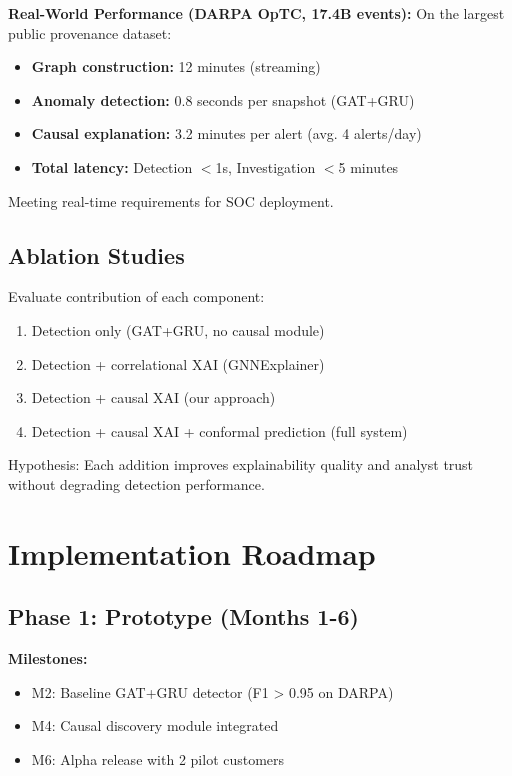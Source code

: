 \documentclass[conference]{IEEEtran}
\begin{document}
\textbf{Real-World Performance (DARPA OpTC, 17.4B events):}
On the largest public provenance dataset:
\begin{itemize}
    \item \textbf{Graph construction:} 12 minutes (streaming)
    \item \textbf{Anomaly detection:} 0.8 seconds per snapshot (GAT+GRU)
    \item \textbf{Causal explanation:} 3.2 minutes per alert (avg. 4 alerts/day)
    \item \textbf{Total latency:} Detection $<$1s, Investigation $<$5 minutes
\end{itemize}

Meeting real-time requirements for SOC deployment.

\subsection{Ablation Studies}

Evaluate contribution of each component:
\begin{enumerate}
    \item Detection only (GAT+GRU, no causal module)
    \item Detection + correlational XAI (GNNExplainer)
    \item Detection + causal XAI (our approach)
    \item Detection + causal XAI + conformal prediction (full system)
\end{enumerate}

Hypothesis: Each addition improves explainability quality and analyst trust without degrading detection performance.

\section{Implementation Roadmap}

\subsection{Phase 1: Prototype (Months 1-6)}

\textbf{Milestones:}
\begin{itemize}
    \item M2: Baseline GAT+GRU detector (F1 > 0.95 on DARPA)
    \item M4: Causal discovery module integrated
    \item M6: Alpha release with 2 pilot customers
\end{itemize}
\end{document}
